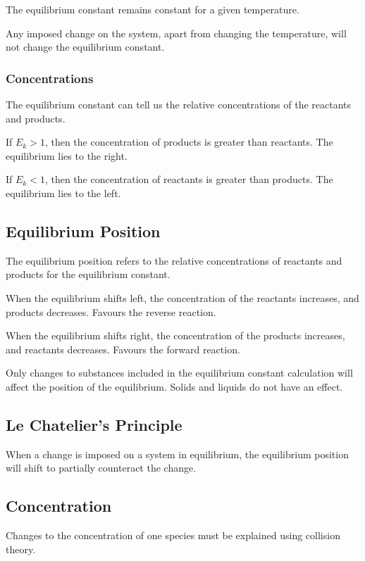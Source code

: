 \documentclass[a4paper,11pt]{article}
\begin{document}
The equilibrium constant remains constant for a given temperature.

Any imposed change on the system, apart from changing the temperature, will not
change the equilibrium constant.


\subsubsection{Concentrations}

The equilibrium constant can tell us the relative concentrations of the
reactants and products.

If $E_k > 1$, then the concentration of products is greater than reactants.
The equilibrium lies to the right.

If $E_k < 1$, then the concentration of reactants is greater than products.
The equilibrium lies to the left.


\subsection{Equilibrium Position}

The equilibrium position refers to the relative concentrations of reactants and
products for the equilibrium constant.

When the equilibrium shifts left, the concentration of the reactants increases,
and products decreases. Favours the reverse reaction.

When the equilibrium shifts right, the concentration of the products increases,
and reactants decreases. Favours the forward reaction.

Only changes to substances included in the equilibrium constant calculation will
affect the position of the equilibrium. Solids and liquids do not have an
effect.


\subsection{Le Chatelier's Principle}

When a change is imposed on a system in equilibrium, the equilibrium position
will shift to partially counteract the change.


\subsection{Concentration}

Changes to the concentration of one species must be explained using collision
theory.
\end{document}
